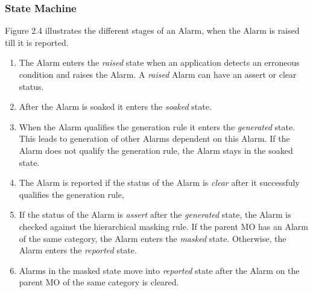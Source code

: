 \begin{flushleft}
\subsubsection{State Machine}

Figure 2.4 illustrates the different stages of an Alarm, when the Alarm is raised till it is reported.
\begin{enumerate}
\item
The Alarm enters the \textit{raised} state when an application detects an erroneous condition and raises the Alarm. A \textit{raised} Alarm can have an 
assert or clear status.
\item

After the Alarm is soaked it enters the \textit{soaked} state.
\item

When the Alarm qualifies the generation rule it enters the \textit{generated} state. This leads to generation of other Alarms dependent on this Alarm.
If the Alarm does not qualify the generation rule, the Alarm stays in the soaked state.
\item
The Alarm is reported if the status of the Alarm is \textit{clear} after it successfuly qualifies the generation rule, 
\item

If the status of the Alarm is \textit{assert} after the \textit{generated} state, the Alarm is checked against the hierarchical masking rule. If the parent MO has 
an Alarm of the same category, the Alarm enters the \textit{masked} state. Otherwise, the Alarm enters the \textit{reported} state.
\item

Alarms in the masked state move into \textit{reported} state after the Alarm on the parent MO of the same category is cleared.
\end{enumerate}

\end{flushleft}

